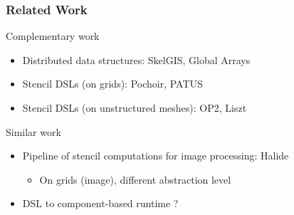 \documentclass{beamer}
\begin{document}
\begin{frame}
\frametitle{Related Work}
\begin{block}{Complementary work}
\begin{itemize}
\item Distributed data structures: SkelGIS, Global Arrays
\item Stencil DSLs (on grids): Pochoir, PATUS
\item Stencil DSLs (on unstructured meshes): OP2, Liszt
\end{itemize}
\end{block}
\begin{alertblock}{Similar work}
\begin{itemize}
\item Pipeline of stencil computations for image processing: Halide
\begin{itemize}
\item On grids (image), different abstraction level
\end{itemize}
\item DSL to component-based runtime ?
\end{itemize}
\end{alertblock}
\end{frame}

\end{document}

